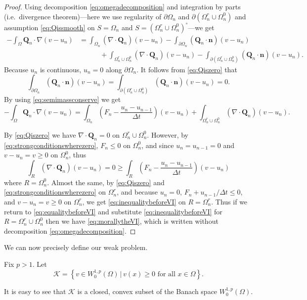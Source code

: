 \documentclass[final,leqno,onefignum,onetabnum]{siamltex1213bueler}
\newcommand\bn{\mathbf{n}}
\newcommand\bQ{\mathbf{Q}}
\newcommand{\Div}{\nabla\cdot}
\renewcommand{\grad}{\nabla}
\begin{document}
\begin{proof}
Using decomposition \eqref{eq:omegadecomposition} and integration by parts (i.e.~divergence theorem)---here we use regularity of $\partial \Omega_n$ and $\partial(\Omega_n^r \cup \Omega_n^0)$ and assumption \eqref{eq:Qissmooth} on $S=\Omega_n$ and $S=(\Omega_n^r \cup \Omega_n^0)^\circ$---we get
\begin{align*}
-\int_{\Omega} \bQ_n \cdot \grad(v-u_n) &= \int_{\Omega_n} (\Div \bQ_n) (v-u_n) - \int_{\partial \Omega_n} (\bQ_n \cdot \bn) (v-u_n) \\
  &\qquad\quad + \int_{\Omega_n^r \cup \Omega_n^0} (\Div \bQ_n) (v-u_n) - \int_{\partial(\Omega_n^r \cup \Omega_n^0)} (\bQ_n \cdot \bn) (v-u_n).
\end{align*}
Because $u_n$ is continuous, $u_n=0$ along $\partial \Omega_n$.  It follows from \eqref{eq:Qiszero} that
       $$\int_{\partial \Omega_n} (\bQ_n \cdot \bn) (v-u_n) = \int_{\partial(\Omega_n^r \cup \Omega_n^0)} (\bQ_n \cdot \bn) (v-u_n) = 0.$$
By using \eqref{eq:semimassconserve} we get
\begin{equation}
-\int_{\Omega} \bQ_n \cdot \grad(v-u_n) = \int_{\Omega_n} \left(F_n - \frac{u_n - u_{n-1}}{\Delta t}\right) (v-u_n) + \int_{\Omega_n^r \cup \Omega_n^0} (\Div \bQ_n) (v-u_n). \label{eq:equalitybeforeVI}
\end{equation}

By \eqref{eq:Qiszero} we have $\Div \bQ_n=0$ on $\Omega_n^r \cup \Omega_n^0$.  However, by \eqref{eq:strongconditionswherezero}, $F_n \le 0$ on $\Omega_n^0$, and since $u_n=u_{n-1}=0$ and $v-u_n = v \ge 0$ on $\Omega_n^0$, thus
\begin{equation}
    \int_R (\Div \bQ_n) (v-u_n) = 0 \ge \int_R \left(F_n - \frac{u_n - u_{n-1}}{\Delta t}\right) (v-u_n)  \label{eq:inequalitybeforeVI}
\end{equation}
where $R=\Omega_n^0$.  Almost the same, by \eqref{eq:Qiszero} and \eqref{eq:strongconditionswherezero} on $\Omega_n^r$, and because $u_n=0$, $F_n + u_{n-1}/\Delta t \le 0$, and $v-u_n = v \ge 0$ on $\Omega_n^r$, we get \eqref{eq:inequalitybeforeVI} on $R=\Omega_n^r$.  Thus if we return to \eqref{eq:equalitybeforeVI} and substitute \eqref{eq:inequalitybeforeVI} for $R=\Omega_n^r \cup \Omega_n^0$ then we have \eqref{eq:morallytheVI}, which is written without decomposition \eqref{eq:omegadecomposition}.
\end{proof}

\medskip
We can now precisely define our weak problem.

\medskip
\begin{definition}  Fix $p>1$.  Let
    $$\mathcal{K} = \left\{v \in W_0^{1,p}(\Omega) \,\big|\, v(x) \ge 0 \text{ for all } x \in \Omega\right\}.$$
\end{definition}
It is easy to see that $\mathcal{K}$ is a closed, convex subset of the Banach space $W_0^{1,p}(\Omega)$.  
\end{document}

